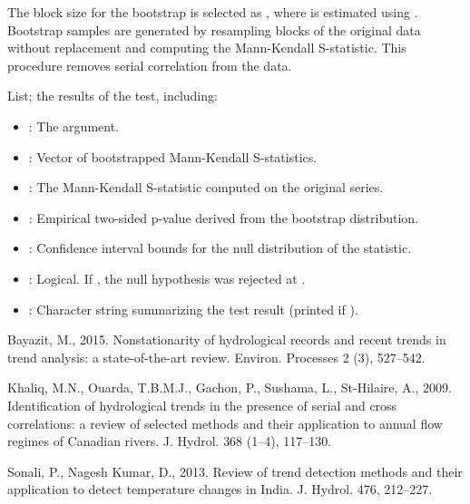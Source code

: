 \documentclass[a4paper]{book}
\begin{document}
%
\begin{Details}
The block size for the bootstrap is selected as , where 
is estimated using . Bootstrap samples are generated by
resampling blocks of the original data without replacement and computing the
Mann-Kendall S-statistic. This procedure removes serial correlation from the data.
\end{Details}
%
\begin{Value}
List; the results of the test, including:
\begin{itemize}

\item{} : The  argument.
\item{} : Vector of bootstrapped Mann-Kendall S-statistics.
\item{} : The Mann-Kendall S-statistic computed on the original series.
\item{} : Empirical two-sided p-value derived from the bootstrap distribution.
\item{} : Confidence interval bounds for the null distribution of the statistic.
\item{} : Logical. If , the null hypothesis was rejected at .
\item{} : Character string summarizing the test result (printed if ).

\end{itemize}

\end{Value}
%
\begin{References}
Bayazit, M., 2015. Nonstationarity of hydrological records and recent trends in trend
analysis: a state-of-the-art review. Environ. Processes 2 (3), 527–542.

Khaliq, M.N., Ouarda, T.B.M.J., Gachon, P., Sushama, L., St-Hilaire, A., 2009.
Identification of hydrological trends in the presence of serial and cross correlations:
a review of selected methods and their application to annual flow regimes of Canadian
rivers. J. Hydrol. 368 (1–4), 117–130. 

Sonali, P., Nagesh Kumar, D., 2013. Review of trend detection methods and their
application to detect temperature changes in India. J. Hydrol. 476, 212–227.
\end{References}
\end{document}
